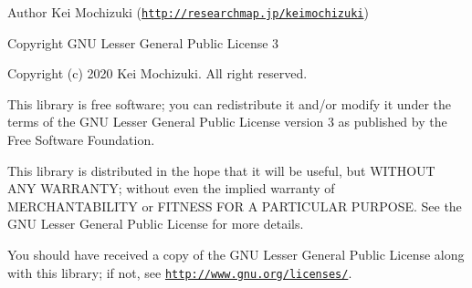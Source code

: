 \begin{DoxyAuthor}{Author}
Kei Mochizuki (\href{http://researchmap.jp/keimochizuki}{\tt http\+://researchmap.\+jp/keimochizuki}) 
\end{DoxyAuthor}
\begin{DoxyCopyright}{Copyright}
G\+NU Lesser General Public License 3
\end{DoxyCopyright}
Copyright (c) 2020 Kei Mochizuki. All right reserved.

This library is free software; you can redistribute it and/or modify it under the terms of the G\+NU Lesser General Public License version 3 as published by the Free Software Foundation.

This library is distributed in the hope that it will be useful, but W\+I\+T\+H\+O\+UT A\+NY W\+A\+R\+R\+A\+N\+TY; without even the implied warranty of M\+E\+R\+C\+H\+A\+N\+T\+A\+B\+I\+L\+I\+TY or F\+I\+T\+N\+E\+SS F\+OR A P\+A\+R\+T\+I\+C\+U\+L\+AR P\+U\+R\+P\+O\+SE. See the G\+NU Lesser General Public License for more details.

You should have received a copy of the G\+NU Lesser General Public License along with this library; if not, see \href{http://www.gnu.org/licenses/}{\tt http\+://www.\+gnu.\+org/licenses/}.

